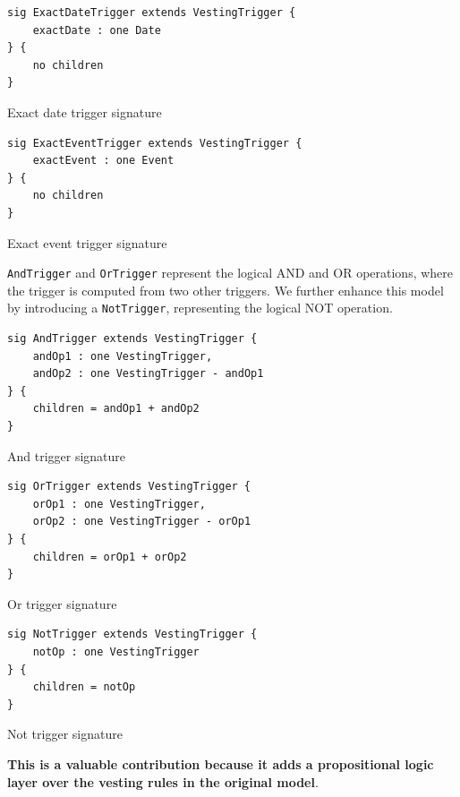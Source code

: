 \begin{listing}[H]\label{fig:vs:exact-date-trigger}
	\begin{verbatim}
sig ExactDateTrigger extends VestingTrigger {
    exactDate : one Date
} {
    no children
}
\end{verbatim}
	\caption{Exact date trigger signature}
\end{listing}

\begin{listing}[H]\label{fig:vs:exact-event-trigger}
	\begin{verbatim}
sig ExactEventTrigger extends VestingTrigger {
    exactEvent : one Event
} { 
    no children
}
\end{verbatim}
	\caption{Exact event trigger signature}
\end{listing}

\verb|AndTrigger| and \verb|OrTrigger| represent the logical AND and OR operations, where the trigger is computed from two other triggers. We further enhance this model by introducing a \verb|NotTrigger|, representing the logical NOT operation.

\begin{listing}[H]\label{fig:vs:and=trigger}
	\begin{verbatim}
sig AndTrigger extends VestingTrigger {
	andOp1 : one VestingTrigger,
	andOp2 : one VestingTrigger - andOp1
} {
	children = andOp1 + andOp2
}
\end{verbatim}
	\caption{And trigger signature}
\end{listing}

\begin{listing}[H]\label{fig:vs:or-trigger}
	\begin{verbatim}
sig OrTrigger extends VestingTrigger {
    orOp1 : one VestingTrigger,
    orOp2 : one VestingTrigger - orOp1
} {
	children = orOp1 + orOp2
}
\end{verbatim}
	\caption{Or trigger signature}
\end{listing}

\begin{listing}[H]\label{fig:vs:not-trigger}
	\begin{verbatim}
sig NotTrigger extends VestingTrigger {
    notOp : one VestingTrigger
} {
    children = notOp
}
\end{verbatim}
	\caption{Not trigger signature}
\end{listing}

\textbf{This is a valuable contribution because it adds a propositional logic layer over the vesting rules in the original model}.


